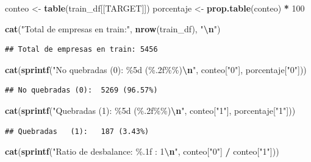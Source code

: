 \documentclass[
]{book}
\newenvironment{Shaded}{\begin{snugshade}}{\end{snugshade}}
\newcommand{\DecValTok}[1]{\textcolor[rgb]{0.00,0.00,0.81}{#1}}
\newcommand{\FunctionTok}[1]{\textcolor[rgb]{0.13,0.29,0.53}{\textbf{#1}}}
\newcommand{\NormalTok}[1]{#1}
\newcommand{\OtherTok}[1]{\textcolor[rgb]{0.56,0.35,0.01}{#1}}
\newcommand{\SpecialCharTok}[1]{\textcolor[rgb]{0.81,0.36,0.00}{\textbf{#1}}}
\newcommand{\StringTok}[1]{\textcolor[rgb]{0.31,0.60,0.02}{#1}}
\begin{document}
\begin{Shaded}
\begin{Highlighting}[]
\NormalTok{conteo     }\OtherTok{\textless{}{-}} \FunctionTok{table}\NormalTok{(train\_df[[TARGET]])}
\NormalTok{porcentaje }\OtherTok{\textless{}{-}} \FunctionTok{prop.table}\NormalTok{(conteo) }\SpecialCharTok{*} \DecValTok{100}

\FunctionTok{cat}\NormalTok{(}\StringTok{"Total de empresas en train:"}\NormalTok{, }\FunctionTok{nrow}\NormalTok{(train\_df), }\StringTok{"}\SpecialCharTok{\textbackslash{}n}\StringTok{"}\NormalTok{)}
\end{Highlighting}
\end{Shaded}

\begin{verbatim}
## Total de empresas en train: 5456
\end{verbatim}

\begin{Shaded}
\begin{Highlighting}[]
\FunctionTok{cat}\NormalTok{(}\FunctionTok{sprintf}\NormalTok{(}\StringTok{"No quebradas (0): \%5d (\%.2f\%\%)}\SpecialCharTok{\textbackslash{}n}\StringTok{"}\NormalTok{, conteo[}\StringTok{"0"}\NormalTok{], porcentaje[}\StringTok{"0"}\NormalTok{]))}
\end{Highlighting}
\end{Shaded}

\begin{verbatim}
## No quebradas (0):  5269 (96.57%)
\end{verbatim}

\begin{Shaded}
\begin{Highlighting}[]
\FunctionTok{cat}\NormalTok{(}\FunctionTok{sprintf}\NormalTok{(}\StringTok{"Quebradas   (1): \%5d (\%.2f\%\%)}\SpecialCharTok{\textbackslash{}n}\StringTok{"}\NormalTok{, conteo[}\StringTok{"1"}\NormalTok{], porcentaje[}\StringTok{"1"}\NormalTok{]))}
\end{Highlighting}
\end{Shaded}

\begin{verbatim}
## Quebradas   (1):   187 (3.43%)
\end{verbatim}

\begin{Shaded}
\begin{Highlighting}[]
\FunctionTok{cat}\NormalTok{(}\FunctionTok{sprintf}\NormalTok{(}\StringTok{"Ratio de desbalance: \%.1f : 1}\SpecialCharTok{\textbackslash{}n}\StringTok{"}\NormalTok{, conteo[}\StringTok{"0"}\NormalTok{] }\SpecialCharTok{/}\NormalTok{ conteo[}\StringTok{"1"}\NormalTok{]))}
\end{Highlighting}
\end{Shaded}
\end{document}
